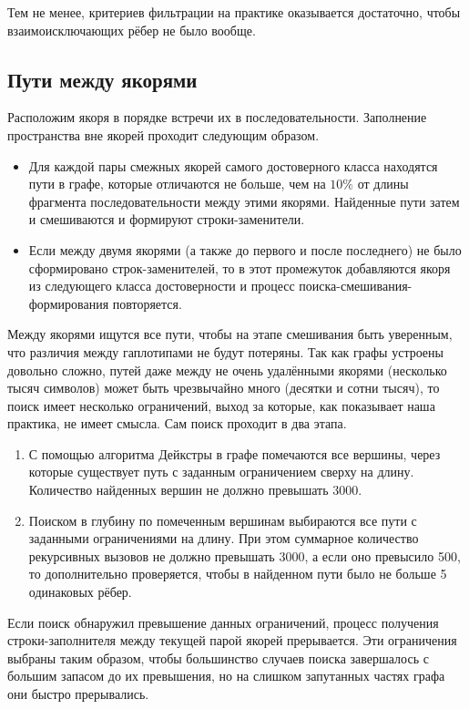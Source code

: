 \documentclass[14pt]{matmex-diploma-custom}
\begin{document}
Тем не менее, критериев фильтрации на практике оказывается достаточно, чтобы взаимоисключающих рёбер не было вообще.

\subsection{Пути между якорями}
Расположим якоря в порядке встречи их в последовательности. Заполнение пространства вне якорей проходит следующим образом.
\begin{itemize}
    \item Для каждой пары смежных якорей самого достоверного класса находятся пути в графе, которые отличаются не больше, чем на $10\%$ от длины фрагмента последовательности между этими якорями. Найденные пути затем и смешиваются и формируют строки-заменители.
    \item Если между двумя якорями (а также до первого и после последнего) не было сформировано строк-заменителей, то в этот промежуток добавляются якоря из следующего класса достоверности и процесс поиска-смешивания-формирования повторяется.
\end{itemize}

Между якорями ищутся все пути, чтобы на этапе смешивания быть уверенным, что различия между гаплотипами не будут потеряны. Так как графы устроены довольно сложно, путей даже между не очень удалёнными якорями (несколько тысяч символов) может быть чрезвычайно много (десятки и сотни тысяч), то поиск имеет несколько ограничений, выход за которые, как показывает наша практика, не имеет смысла. Сам поиск проходит в два этапа.
\begin{enumerate}
    \item С помощью алгоритма Дейкстры в графе помечаются все вершины, через которые существует путь с заданным ограничением сверху на длину. Количество найденных вершин не должно превышать 3000.
    \item Поиском в глубину по помеченным вершинам выбираются все пути с заданными ограничениями на длину. При этом суммарное количество рекурсивных вызовов не должно превышать 3000, а если оно превысило 500, то дополнительно проверяется, чтобы в найденном пути было не больше 5 одинаковых рёбер.
\end{enumerate}
Если поиск обнаружил превышение данных ограничений, процесс получения строки-заполнителя между текущей парой якорей прерывается. Эти ограничения выбраны таким образом, чтобы большинство случаев поиска завершалось с большим запасом до их превышения, но на слишком запутанных частях графа они быстро прерывались.
\end{document}
